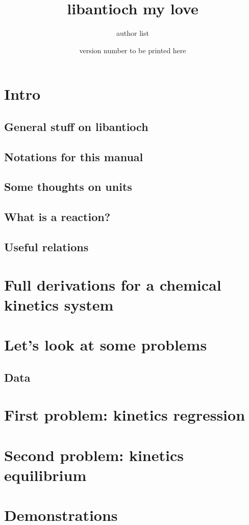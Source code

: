 \documentclass{article}
\begin{document}
\title{libantioch my love}
\date{version number to be printed here}
\author{author list}

\maketitle
\tableofcontents

\section{Intro}

\subsection{General stuff on libantioch}


\subsection{Notations for this manual}


\subsection{Some thoughts on units}
\label{units_in_Antioch}


\subsection{What is a reaction?}
\label{kinetics_gen}


\subsection{Useful relations}
\label{relations}


\section{Full derivations for a chemical kinetics system}
\label{derivations}


\section{Let's look at some problems}
\subsection{Data}


\section{First problem: kinetics regression}


\section{Second problem: kinetics equilibrium}


\appendix
\section{Demonstrations}
\label{demo}

\end{document}
